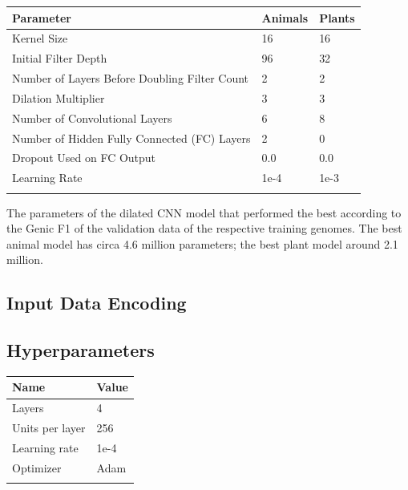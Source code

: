 \documentclass{bioinfo}
\begin{document}
\begin{table}[!t]
 {
\begin{tabular}{@{}lll@{}}
\toprule Parameter & Animals & Plants\\
\midrule
Kernel Size & 16 & 16\\
Initial Filter Depth & 96 & 32\\
Number of Layers Before Doubling Filter Count & 2 & 2\\
Dilation Multiplier & 3 & 3\\
Number of Convolutional Layers & 6 & 8\\
Number of Hidden Fully Connected (FC) Layers & 2 & 0\\
Dropout Used on FC Output & 0.0 & 0.0\\
Learning Rate & 1e-4 & 1e-3\\
\botrule
\end{tabular}}{The parameters of the dilated CNN model that performed the best according to the Genic F1 of the validation data of the respective training genomes. The best animal model has circa 4.6 million parameters; the best plant model around 2.1 million.}
\end{table}


\subsection{Input Data Encoding}


\subsection{Hyperparameters}

\begin{table}[!t]
 {
\begin{tabular}{@{}ll@{}}
\toprule Name & Value \\
\midrule
Layers & 4\\
Units per layer & 256\\
Learning rate & 1e-4\\
Optimizer & Adam\\
\botrule
\end{tabular}}{}
\end{table}
\end{document}
